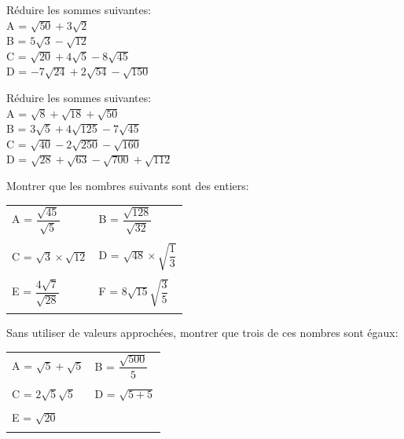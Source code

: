 \begin{exercice}

Réduire les sommes suivantes:\\

A = $\sqrt{50}+3\sqrt{2}$\\

B = $5\sqrt{3}-\sqrt{12}$\\

C = $\sqrt{20}+4\sqrt{5}-8\sqrt{45}$\\

D = $-7\sqrt{24}+2\sqrt{54}-\sqrt{150}$\\
\end{exercice}


\begin{exercice}

Réduire les sommes suivantes:\\

A = $\sqrt{8}+\sqrt{18}+\sqrt{50}$\\

B = $3\sqrt{5}+4\sqrt{125}-7\sqrt{45}$\\

C = $\sqrt{40}-2\sqrt{250}-\sqrt{160}$\\

D = $\sqrt{28}+\sqrt{63}-\sqrt{700}+\sqrt{112}$\\

\end{exercice}

\begin{exercice}
Montrer que les nombres suivants sont des entiers:\\

\begin{tabular}{m{3.8cm}m{3.5cm}}
A = $\dfrac{\sqrt{45}}{\sqrt{5}}$ & B = $\dfrac{\sqrt{128}}{\sqrt{32}}$\\
&\\
C = $\sqrt{3} \times \sqrt{12}$ & D = $\sqrt{48} \times \sqrt{\dfrac{1}{3}}$\\
&\\
E = $\dfrac{4\sqrt{7}}{\sqrt{28}}$ & F = $8\sqrt{15} \sqrt{\dfrac{3}{5}}$\\
&\\


\end{tabular}
\end{exercice}

\begin{exercice}
Sans utiliser de valeurs approchées, montrer que trois de ces nombres sont égaux:\\

\begin{tabular}{m{3.8cm}m{3.5cm}}
A = $\sqrt{5}+\sqrt{5}$ & B = $\dfrac{\sqrt{500}}{5}$\\
&\\
C = $2\sqrt{5} \sqrt{5}$ & D = $\sqrt{5+5}$\\
&\\
E = $\sqrt{20}$ &\\
&\\


\end{tabular}
\end{exercice}

